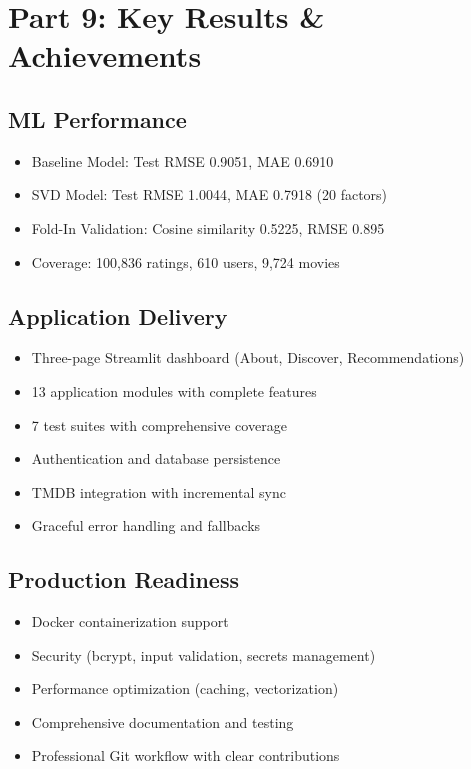 \documentclass[11pt,a4paper]{article}
\begin{document}

\section{Part 9: Key Results \& Achievements}

\subsection{ML Performance}

\begin{itemize}
    \item Baseline Model: Test RMSE 0.9051, MAE 0.6910
    \item SVD Model: Test RMSE 1.0044, MAE 0.7918 (20 factors)
    \item Fold-In Validation: Cosine similarity 0.5225, RMSE 0.895
    \item Coverage: 100,836 ratings, 610 users, 9,724 movies
\end{itemize}

\subsection{Application Delivery}

\begin{itemize}
    \item Three-page Streamlit dashboard (About, Discover, Recommendations)
    \item 13 application modules with complete features
    \item 7 test suites with comprehensive coverage
    \item Authentication and database persistence
    \item TMDB integration with incremental sync
    \item Graceful error handling and fallbacks
\end{itemize}

\subsection{Production Readiness}

\begin{itemize}
    \item Docker containerization support
    \item Security (bcrypt, input validation, secrets management)
    \item Performance optimization (caching, vectorization)
    \item Comprehensive documentation and testing
    \item Professional Git workflow with clear contributions
\end{itemize}
\end{document}
